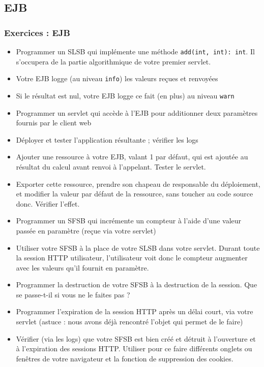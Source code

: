 \documentclass[english, french]{beamer}
\begin{document}
\subsection{EJB}
\begin{frame}[allowframebreaks]
	\frametitle{Exercices : EJB}
	\begin{itemize}
		\item Programmer un SLSB qui implémente une méthode \texttt{add(int, int): int}. Il s’occupera de la partie algorithmique de votre premier servlet.
		\item Votre EJB logge (au niveau \texttt{info}) les valeurs reçues et renvoyées
		\item Si le résultat est nul, votre EJB logge ce fait (en plus) au niveau \texttt{warn}
		\item Programmer un servlet qui accède à l’EJB pour additionner deux paramètres fournis par le client web
		\item Déployer et tester l’application résultante ; vérifier les logs
		\item Ajouter une ressource à votre EJB, valant 1 par défaut, qui est ajoutée au résultat du calcul avant renvoi à l’appelant. Tester le servlet.
		\item Exporter cette ressource, prendre son chapeau de responsable du déploiement, et modifier la valeur par défaut de la ressource, sans toucher au code source donc. Vérifier l’effet.
		\item Programmer un SFSB qui incrémente un compteur à l’aide d’une valeur passée en paramètre (reçue via votre servlet)
		\item Utiliser votre SFSB à la place de votre SLSB dans votre servlet. Durant toute la session HTTP utilisateur, l’utilisateur voit donc le compteur augmenter avec les valeurs qu’il fournit en paramètre.
		\item Programmer la destruction de votre SFSB à la destruction de la session. Que se passe-t-il si vous ne le faites pas ?
		\item Programmer l’expiration de la session HTTP après un délai court, via votre servlet (astuce : nous avons déjà rencontré l’objet qui permet de le faire)
		\item Vérifier (via les logs) que votre SFSB est bien créé et détruit à l’ouverture et à l’expiration des sessions HTTP. Utiliser pour ce faire différents onglets ou fenêtres de votre navigateur et la fonction de suppression des cookies.
	\end{itemize}
\end{frame}
\end{document}
